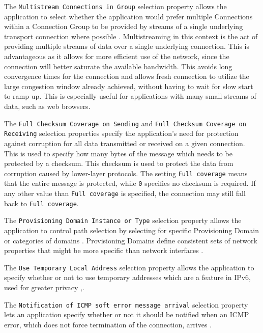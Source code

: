 The \texttt{Multistream Connections in Group} selection property
allows the application to select whether the
application would prefer multiple Connections within a
Connection Group to be provided by streams of a single
underlying transport connection where possible
\cite{paulyArchitectureRequirementsTransport2025}.
Multistreaming in this context is the act of providing multiple
streams of data over a single underlying connection. This is
advantageous as it allows for more efficient use of the network,
since the connection will better saturate the available
bandwidth. This avoids long convergence times for the connection
and allows fresh connection to utilize the large congestion
window already achieved, without having to wait for slow start
to ramp up. This is especially useful for applications with many
small streams of data, such as web browsers.

The \texttt{Full Checksum Coverage on Sending} and \texttt{Full
	Checksum Coverage on Re\-ceiving} selection properties specify
the application's need for protection against corruption for all
data transmitted or received on a given connection. This is used
to specify how many bytes of the message which needs to be
protected by a checksum. This checksum is used to protect the
data from corruption caused by lower-layer protocols. The
setting \texttt{Full coverage} means that the entire message is
protected, while \texttt{0} specifies no checksum is required.
If any other value than \texttt{Full coverage} is specified, the
connection may still fall back to \texttt{Full coverage}.

The \texttt{Provisioning Domain Instance or Type} selection
property allows the application
to control path selection by selecting for specific Provisioning
Domain or categories of domains
\cite{paulyArchitectureRequirementsTransport2025}. Provisioning
Domains define consistent sets of network properties that might
be more specific than network interfaces
\cite{paulyArchitectureRequirementsTransport2025}.

The \texttt{Use Temporary Local Address} selection property
allows the application to specify
whether or not to use temporary addresses which are a feature in
IPv6, used for greater privacy
\cite{gontTemporaryAddressExtensions2021},\cite{paulyArchitectureRequirementsTransport2025}.

The \texttt{Notification of ICMP soft error message arrival}
selection property lets an application specify whether or 
not it should be notified when an ICMP
error, which does not force termination of the connection,
arrives \cite{paulyArchitectureRequirementsTransport2025}.

